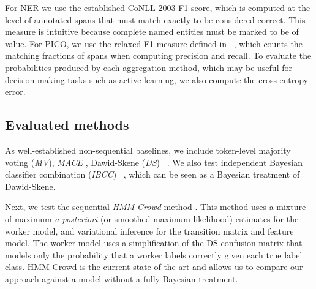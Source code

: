 For NER we use the established CoNLL 2003 F1-score, which is computed at the level of annotated spans that must match exactly to be considered correct. This measure is intuitive because complete named entities must be marked to be of value. For PICO, we use the relaxed F1-measure defined in ~\cite{nguyen2017aggregating}, which counts the matching fractions of spans when computing precision and recall. 
To evaluate the probabilities produced by each aggregation method, which may be useful for decision-making tasks such as active learning, we also compute the cross entropy error.

\subsection{Evaluated methods}

As well-established non-sequential baselines, we include token-level majority voting (\emph{MV}), \emph{MACE} \cite{hovy2013learning}, Dawid-Skene (\emph{DS}) ~\cite{dawid_maximum_1979}.  We also test independent Bayesian classifier combination (\emph{IBCC}) ~\cite{kim2012bayesian}, which can be seen as a Bayesian treatment of Dawid-Skene. 

Next, we test the sequential \emph{HMM-Crowd} method \cite{nguyen2017aggregating}. This method uses a mixture of maximum \emph{a posteriori} (or smoothed maximum likelihood) estimates for the worker model, and variational inference for the transition matrix and feature model. The worker model uses a simplification of the DS confusion matrix that models only the probability that a worker labels correctly given each true label class. HMM-Crowd is the current state-of-the-art and allows us to compare our approach against a model without a fully Bayesian treatment. 

